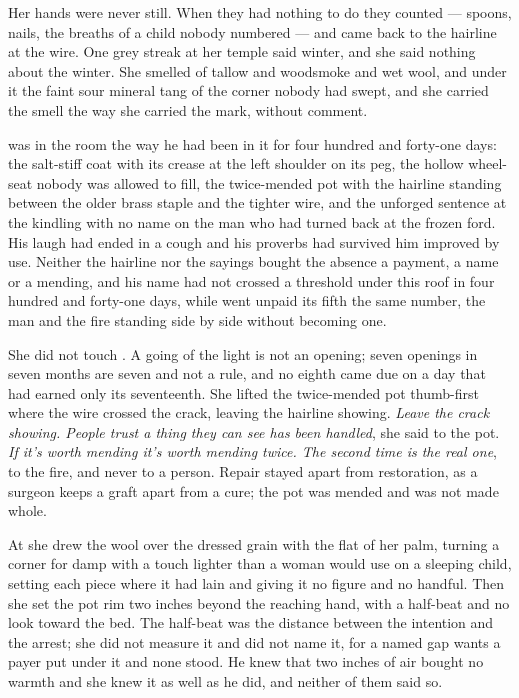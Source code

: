 Her hands were never still. When they had nothing to do they counted --- spoons, nails, the breaths of a child nobody numbered --- and came back to the hairline at the wire. One grey streak at her temple said winter, and she said nothing about the winter. She smelled of tallow and woodsmoke and wet wool, and under it the faint sour mineral tang of the corner nobody had swept, and she carried the smell the way she carried the mark, without comment.

 was in the room the way he had been in it for four hundred and forty-one days: the salt-stiff coat with its crease at the left shoulder on its peg, the hollow wheel-seat nobody was allowed to fill, the twice-mended pot with the hairline standing between the older brass staple and the tighter wire, and the unforged sentence at the kindling with no name on the man who had turned back at the frozen ford. His laugh had ended in a cough and his proverbs had survived him improved by use. Neither the hairline nor the sayings bought the absence a payment, a name or a mending, and his name had not crossed a threshold under this roof in four hundred and forty-one days, while  went unpaid its fifth the same number, the man and the fire standing side by side without becoming one.

She did not touch . A going of the light is not an opening; seven openings in seven months are seven and not a rule, and no eighth came due on a day that had earned only its seventeenth. She lifted the twice-mended pot thumb-first where the wire crossed the crack, leaving the hairline showing. \emph{Leave the crack showing. People trust a thing they can see has been handled}, she said to the pot. \emph{If it's worth mending it's worth mending twice. The second time is the real one}, to the fire, and never to a person. Repair stayed apart from restoration, as a surgeon keeps a graft apart from a cure; the pot was mended and was not made whole.

At  she drew the wool over the dressed grain with the flat of her palm, turning a corner for damp with a touch lighter than a woman would use on a sleeping child, setting each piece where it had lain and giving it no figure and no handful. Then she set the pot rim two inches beyond the reaching hand, with a half-beat and no look toward the bed. The half-beat was the distance between the intention and the arrest; she did not measure it and did not name it, for a named gap wants a payer put under it and none stood. He knew that two inches of air bought no warmth and she knew it as well as he did, and neither of them said so.

